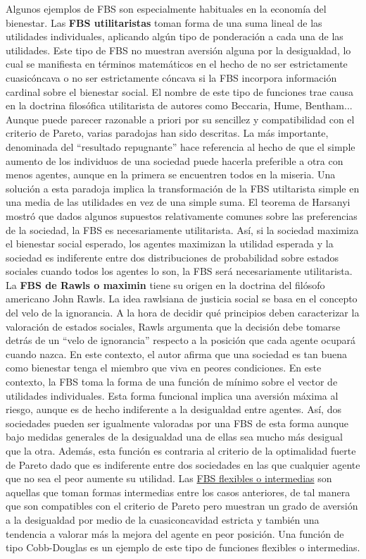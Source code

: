 \documentclass{nuevotema}
\begin{document}
Algunos ejemplos de FBS son especialmente habituales en la economía del bienestar. Las \textbf{FBS utilitaristas} toman forma de una suma lineal de las utilidades individuales, aplicando algún tipo de ponderación a cada una de las utilidades. Este tipo de FBS no muestran aversión alguna por la desigualdad, lo cual se manifiesta en términos matemáticos en el hecho de no ser estrictamente cuasicóncava o no ser estrictamente cóncava si la FBS incorpora información cardinal sobre el bienestar social. El nombre de este tipo de funciones trae causa en la doctrina filosófica utilitarista de autores como Beccaria, Hume, Bentham... Aunque puede parecer razonable a priori por su sencillez y compatibilidad con el criterio de Pareto, varias paradojas han sido descritas. La más importante, denominada del ``resultado repugnante'' hace referencia al hecho de que el simple aumento de los individuos de una sociedad puede hacerla preferible a otra con menos agentes, aunque en la primera se encuentren todos en la miseria. Una solución a esta paradoja implica la transformación de la FBS utiltarista simple en una media de las utilidades en vez de una simple suma. El teorema de Harsanyi mostró que dados algunos supuestos relativamente comunes sobre las preferencias de la sociedad, la FBS es necesariamente utilitarista. Así, si la sociedad maximiza el bienestar social esperado, los agentes maximizan la utilidad esperada y la sociedad es indiferente entre dos distribuciones de probabilidad sobre estados sociales cuando todos los agentes lo son, la FBS será necesariamente utilitarista. La \textbf{FBS de Rawls o maximin} tiene su origen en la doctrina del filósofo americano John Rawls. La idea rawlsiana de justicia social se basa en el concepto del velo de la ignorancia. A la hora de decidir qué principios deben caracterizar la valoración de estados sociales, Rawls argumenta que la decisión debe tomarse detrás de un ``velo de ignorancia'' respecto a la posición que cada agente ocupará cuando nazca. En este contexto, el autor afirma que una sociedad es tan buena como bienestar tenga el miembro que viva en peores condiciones. En este contexto, la FBS toma la forma de una función de mínimo sobre el vector de utilidades individuales. Esta forma funcional implica una aversión máxima al riesgo, aunque es de hecho indiferente a la desigualdad entre agentes. Así, dos sociedades pueden ser igualmente valoradas por una FBS de esta forma aunque bajo medidas generales de la desigualdad una de ellas sea mucho más desigual que la otra. Además, esta función es contraria al criterio de la optimalidad fuerte de Pareto dado que es indiferente entre dos sociedades en las que cualquier agente que no sea el peor aumente su utilidad. Las \underline{FBS flexibles o intermedias} son aquellas que toman formas intermedias entre los casos anteriores, de tal manera que son compatibles con el criterio de Pareto pero muestran un grado de aversión a la desigualdad por medio de la cuasiconcavidad estricta y también una tendencia a valorar más la mejora del agente en peor posición. Una función de tipo Cobb-Douglas es un ejemplo de este tipo de funciones flexibles o intermedias. 
\end{document}
